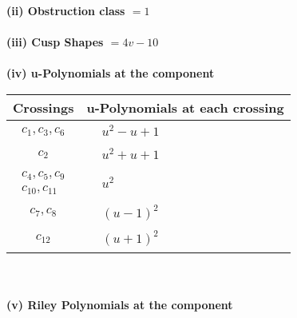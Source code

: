 \documentclass[1p]{elsarticle_modified}
\theoremstyle{definition}
\begin{document}
\flushleft \textbf{(ii) Obstruction class $= 1$}\\~\\
\flushleft \textbf{(iii) Cusp Shapes $= 4 v-10$}\\~\\
\newpage\renewcommand{\arraystretch}{1}
\flushleft \textbf{(iv) u-Polynomials at the component}\newline \\
\begin{tabular}{m{50pt}|m{274pt}}
Crossings & \hspace{64pt}u-Polynomials at each crossing \\
\hline $$\begin{aligned}c_{1},c_{3},c_{6}\end{aligned}$$&$\begin{aligned}
&u^2- u+1
\end{aligned}$\\
\hline $$\begin{aligned}c_{2}\end{aligned}$$&$\begin{aligned}
&u^2+u+1
\end{aligned}$\\
\hline $$\begin{aligned}c_{4},c_{5},c_{9}\\c_{10},c_{11}\end{aligned}$$&$\begin{aligned}
&u^2
\end{aligned}$\\
\hline $$\begin{aligned}c_{7},c_{8}\end{aligned}$$&$\begin{aligned}
&(u-1)^2
\end{aligned}$\\
\hline $$\begin{aligned}c_{12}\end{aligned}$$&$\begin{aligned}
&(u+1)^2
\end{aligned}$\\
\hline
\end{tabular}\\~\\
\newpage\renewcommand{\arraystretch}{1}
\flushleft \textbf{(v) Riley Polynomials at the component}\newline \\
\end{document}
